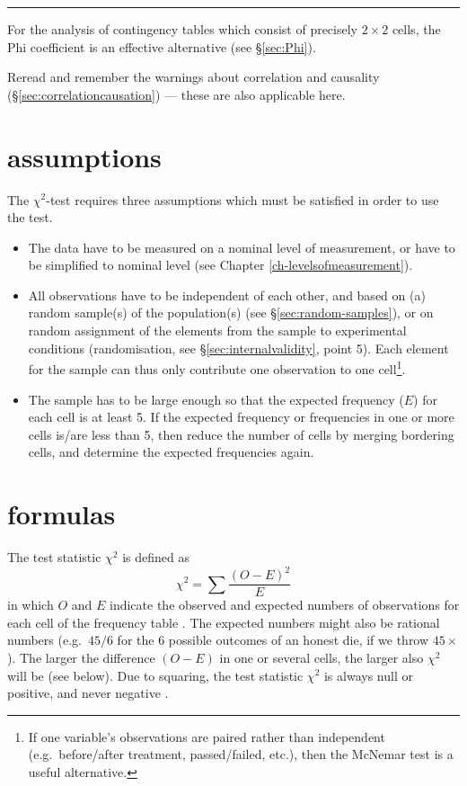 \documentclass[
]{book}
\begin{document}
\begin{center}\rule{0.5\linewidth}{0.5pt}\end{center}

For the analysis of contingency tables which consist of precisely
\(2\times2\) cells, the Phi coefficient is an effective alternative
(see §\ref{sec:Phi}).

Reread and remember the warnings about correlation and causality
(§\ref{sec:correlationcausation})
--- these are also applicable here.

\hypertarget{sec:chi2test-assumptions}{%
\section{assumptions}\label{sec:chi2test-assumptions}}

The \(\chi^2\)-test requires three assumptions which must be satisfied
in order to use the test.

\begin{itemize}
\item
  The data have to be measured on a nominal level of measurement, or have
  to be simplified to nominal level (see Chapter \ref{ch-levelsofmeasurement}).
\item
  All observations have to be independent of each other, and based
  on (a) random sample(s) of the population(s) (see
  §\ref{sec:random-samples}), or on random assignment of the elements
  from the sample to experimental conditions (randomisation, see
  §\ref{sec:internalvalidity}, point 5). Each element for the sample can thus only
  contribute one observation to one cell\footnote{If one variable's observations are paired rather than independent (e.g.~before/after treatment, passed/failed, etc.), then the McNemar test is a useful alternative.}.
\item
  The sample has to be large enough so that the expected frequency
  (\(E\)) for each cell is at least 5. If the expected frequency or frequencies
  in one or more cells is/are less than 5, then reduce the number
  of cells by merging bordering cells, and determine the expected
  frequencies again.
\end{itemize}

\hypertarget{formulas-6}{%
\section{formulas}\label{formulas-6}}

The test statistic \(\chi^2\) is defined as
\begin{equation}
  \label{eq:chisquared}
    \chi^2 = \sum \frac{(O-E)^2}{E}
\end{equation}
in which \(O\) and \(E\) indicate the observed and expected numbers of observations for each cell of the frequency table \citep{Ferg89}. The expected
numbers might also be rational numbers (e.g.~\(45/6\) for the 6 possible
outcomes of an honest die, if we throw
\(45\times\)). The larger the difference \((O-E)\) in one or several cells,
the larger also \(\chi^2\) will be (see below). Due to squaring, the test
statistic \(\chi^2\) is always null or positive, and never negative
\citep{Ferg89}.
\end{document}
